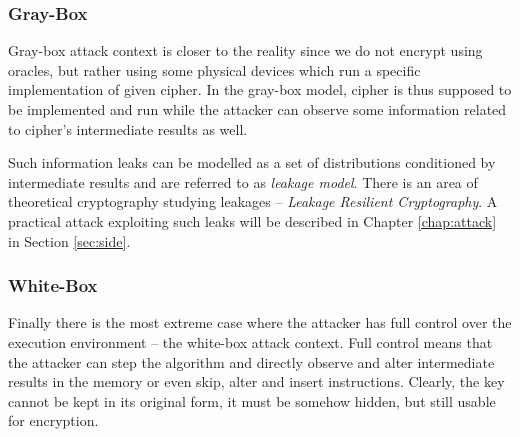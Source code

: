 \subsubsection{Gray-Box}

Gray-box attack context is closer to the reality since we do not encrypt using oracles, but rather using some physical devices which run a specific implementation of given cipher. In the gray-box model, cipher is thus supposed to be implemented and run while the attacker can observe some information related to cipher's intermediate results as well.

Such information leaks can be modelled as a set of distributions conditioned by intermediate results and are referred to as {\em leakage model}. There is an area of theoretical cryptography studying leakages -- {\em Leakage Resilient Cryptography}. A practical attack exploiting such leaks will be described in Chapter \ref{chap:attack} in Section \ref{sec:side}.   %

\subsubsection{White-Box}

Finally there is the most extreme case where the attacker has full control over the execution environment -- the white-box attack context. Full control means that the attacker can step the algorithm and directly observe and alter intermediate results in the memory or even skip, alter and insert instructions. Clearly, the key cannot be kept in its original form, it must be somehow hidden, but still usable for encryption.
